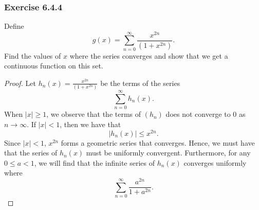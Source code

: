 \subsubsection{Exercise 6.4.4} Define 
\[  g(x) = \sum_{ n=0  }^{ \infty  } \frac{ x^{2n} }{ (1+x^{2n}) }. \]
Find the values of \( x  \) where the series converges and show that we get a continuous function on this set.
\begin{proof}
    Let \( h_n(x) = \frac{ x^{2n} }{ (1 + x^{2n}) }    \) be the terms of the series 
    \[  \sum_{ n=0  }^{ \infty  } h_n(x).\] When \( | x  |  \geq 1  \), we observe that the terms of \( (h_n)  \) does not converge to \( 0  \) as \(  n \to \infty  \). If \( | x  |  < 1  \), then we have that 
    \[  | h_n(x)  |  \leq x^{2n}. \]
    Since \( | x  |  < 1  \), \( x^{2n} \) forms a geometric series that converges. Hence, we must have that the series of \( h_n(x)  \) must be uniformly convergent. Furthermore, for any \( 0 \leq a < 1  \), we will find that the infinite series of \( h_n(x)  \) converges uniformly where 
    \[  \sum_{ n=0  }^{ \infty  } \frac{ a^{2n} }{  1 + a^{2n} }. \]
\end{proof}

